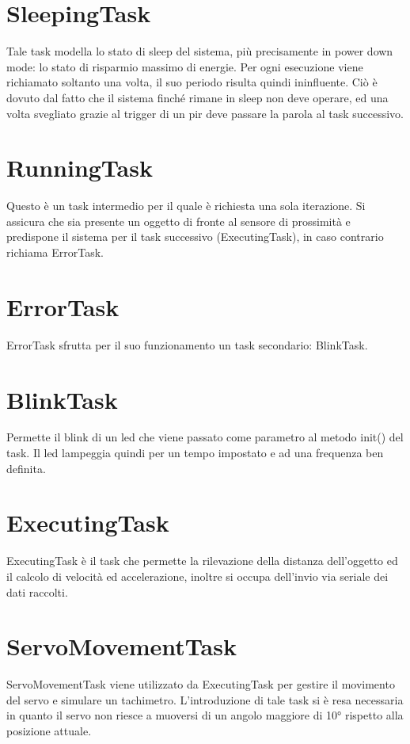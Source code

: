 \documentclass[a4paper,12pt]{report}
\begin{document}
\section{SleepingTask}
Tale task modella lo stato di sleep del sistema, più precisamente in power down mode: lo stato di risparmio massimo di energie. 
Per ogni esecuzione viene richiamato soltanto una volta, il suo periodo risulta quindi ininfluente. Ciò è dovuto dal fatto che il sistema finché rimane in sleep non deve operare, ed una volta svegliato grazie al trigger di un pir deve passare la parola al task successivo.

\section{RunningTask}
Questo è un task intermedio per il quale è richiesta una sola iterazione. Si assicura che sia presente un oggetto di fronte al sensore di prossimità e predispone il sistema per il task successivo (ExecutingTask), in caso contrario richiama ErrorTask.

\section{ErrorTask}
ErrorTask sfrutta per il suo funzionamento un task secondario: BlinkTask.

\section{BlinkTask}
Permette il blink di un led che viene passato come parametro al metodo init() del task. Il led lampeggia quindi per un tempo impostato e ad una frequenza ben definita.

\section{ExecutingTask}
ExecutingTask è il task che permette la rilevazione della distanza dell'oggetto ed il calcolo di velocità ed accelerazione, inoltre si occupa dell'invio via seriale dei dati raccolti.

\section{ServoMovementTask}
ServoMovementTask viene utilizzato da ExecutingTask per gestire il movimento del servo e simulare un tachimetro. L’introduzione di tale task si è resa necessaria in quanto il servo non riesce a muoversi di un angolo maggiore di 10° rispetto alla posizione attuale. 
\end{document}
